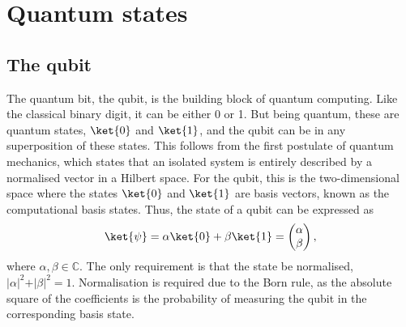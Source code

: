 \section{Quantum states}
\label{sec:qstates}
\subsection{The qubit}
The quantum bit, the qubit, is the building block of quantum computing.
Like the classical binary digit, it can be either 0 or 1.
But being quantum, these are quantum states, $\ket{0}$ and $\ket{1}$\footnotemark{}, and the qubit can be in any superposition of these states.
%
This follows from the first postulate of quantum mechanics\footnotemark, which states that an isolated system is entirely described by a normalised vector in a Hilbert space.
%
For the qubit, this is the two-dimensional space where the states $\ket{0}$ and $\ket{1}$ are basis vectors, known as the computational basis states.
Thus, the state of a qubit can be expressed as
\begin{equation}
  \ket{\psi} = \alpha \ket{0} + \beta \ket{1} = \begin{pmatrix} \alpha \\ \beta \end{pmatrix},
  \label{eq:qubit}
\end{equation}
where $\alpha, \beta \in \mathbb{C}$.
The only requirement is that the state be normalised, $\vert\alpha\vert^2 + \vert\beta\vert^2 = 1$.
Normalisation is required due to the Born rule, as the absolute square of the coefficients is the probability of measuring the qubit in the corresponding basis state.

